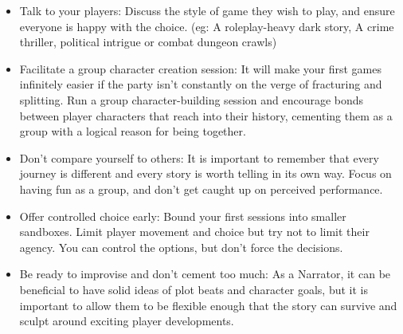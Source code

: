\begin{itemize}
    \item Talk to your players: Discuss the style of game they wish to play, and ensure everyone is happy with the choice. (eg: A roleplay-heavy dark story, A crime thriller, political intrigue or combat dungeon crawls)
    \item Facilitate a group character creation session: It will make your first games infinitely easier if the party isn’t constantly on the verge of fracturing and splitting. Run a group character-building session and encourage bonds between player characters that reach into their history, cementing them as a group with a logical reason for being together.
    \item Don’t compare yourself to others: It is important to remember that every journey is different and every story is worth telling in its own way. Focus on having fun as a group, and don’t get caught up on perceived performance.
    \item Offer controlled choice early: Bound your first sessions into smaller sandboxes. Limit player movement and choice but try not to limit their agency. You can control the options, but don’t force the decisions.
    \item Be ready to improvise and don’t cement too much: As a Narrator, it can be beneficial to have solid ideas of plot beats and character goals, but it is important to allow them to be flexible enough that the story can survive and sculpt around exciting player developments.
\end{itemize}